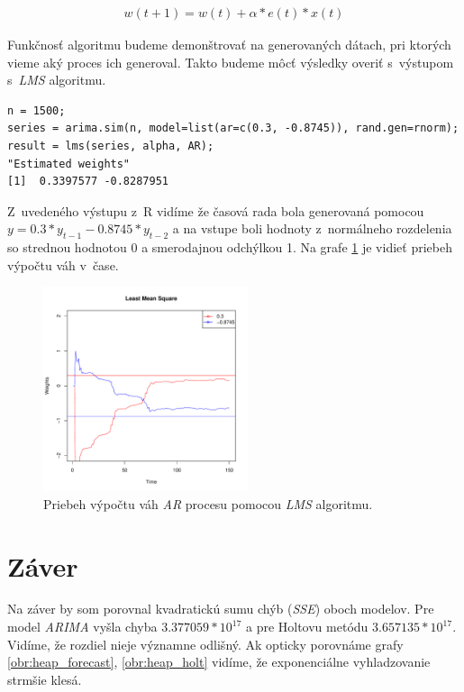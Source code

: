 \documentclass[12pt,a4paper,oneside,final]{article}
\theoremstyle{definition}
\theoremstyle{remark}
\numberwithin{equation}{section}
\begin{document}
\begin{eqnarray} \label{lms}
    w(t+1) = w(t) + \alpha * e(t) * x(t)
\end{eqnarray}

Funkčnosť algoritmu budeme demonštrovať na generovaných dátach, pri ktorých vieme 
aký proces ich generoval. Takto budeme môcť výsledky overiť s~výstupom s~\emph{LMS} algoritmu.

\begin{minipage}{\linewidth}
\begingroup
\fontsize{9pt}{7pt}\selectfont
\begin{verbatim}
n = 1500;
series = arima.sim(n, model=list(ar=c(0.3, -0.8745)), rand.gen=rnorm);
result = lms(series, alpha, AR);
"Estimated weights"
[1]  0.3397577 -0.8287951
\end{verbatim}
\endgroup
\end{minipage}

Z~uvedeného výstupu z~R vidíme že časová rada bola generovaná pomocou
$y = 0.3*y_{t-1} - 0.8745*y_{t-2}$ a na vstupe boli hodnoty z~normálneho rozdelenia so
strednou hodnotou 0 a smerodajnou odchýlkou 1. Na grafe \ref{obr:lms} je vidieť priebeh
výpočtu váh v~čase.

\begin{figure}[H]
    \begin{center}
        \includegraphics[width=.8\textwidth,height=6cm]{images/lms.pdf}
        \caption{Priebeh výpočtu váh \emph{AR} procesu pomocou \emph{LMS} algoritmu.}
        \label{obr:lms}
    \end{center}
\end{figure}

\section{Záver}
Na záver by som porovnal kvadratickú sumu chýb (\emph{SSE}) oboch modelov. Pre
model \emph{ARIMA} vyšla chyba $3.377059*10^{17}$ a pre Holtovu metódu $3.657135*10^{17}$. 
Vidíme, že rozdiel nieje významne odlišný. Ak opticky porovnáme grafy \ref{obr:heap_forecast},
\ref{obr:heap_holt} vidíme, že exponenciálne vyhladzovanie strmšie klesá.
\end{document}
